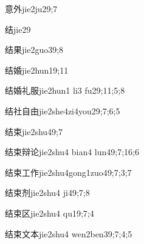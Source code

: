 \begin{verbete}{意外}{jie2ju2}{9;7}
\end{verbete}

\begin{verbete}{结}{jie2}{9}
\end{verbete}

\begin{verbete}{结果}{jie2guo3}{9;8}
\end{verbete}

\begin{verbete}{结婚}{jie2hun1}{9;11}
\end{verbete}

\begin{verbete}{结婚礼服}{jie2hun1 li3 fu2}{9;11;5;8}
\end{verbete}

\begin{verbete}{结社自由}{jie2she4zi4you2}{9;7;6;5}
\end{verbete}

\begin{verbete}{结束}{jie2shu4}{9;7}
\end{verbete}

\begin{verbete}{结束辩论}{jie2shu4 bian4 lun4}{9;7;16;6}
\end{verbete}

\begin{verbete}{结束工作}{jie2shu4gong1zuo4}{9;7;3;7}
\end{verbete}

\begin{verbete}{结束剂}{jie2shu4 ji4}{9;7;8}
\end{verbete}

\begin{verbete}{结束区}{jie2shu4 qu1}{9;7;4}
\end{verbete}

\begin{verbete}{结束文本}{jie2shu4 wen2ben3}{9;7;4;5}
\end{verbete}

